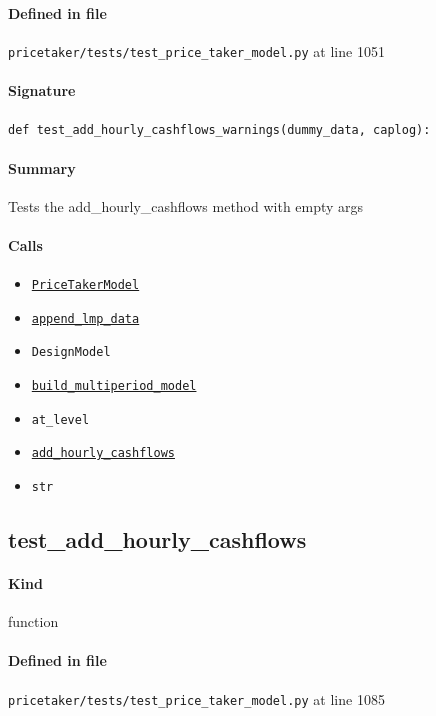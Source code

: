 \documentclass[11pt]{report}
\begin{document}
\paragraph{Defined in file} \texttt{pricetaker/tests/test\_price\_taker\_model.py} at line 1051
\paragraph{Signature} \texttt{def test\_add\_hourly\_cashflows\_warnings(dummy\_data, caplog):}
\paragraph{Summary} Tests the add\_hourly\_cashflows method with empty args
\paragraph{Calls}
\begin{itemize}[leftmargin=*]
  \item \hyperref[def:pricetaker-price_taker_model.py:PriceTakerModel:L161]{\texttt{PriceTakerModel}}
  \item \hyperref[def:pricetaker-price_taker_model.py:PriceTakerModel.append_lmp_data:L221]{\texttt{append\_lmp\_data}}
  \item \texttt{DesignModel}
  \item \hyperref[def:pricetaker-price_taker_model.py:PriceTakerModel.build_multiperiod_model:L291]{\texttt{build\_multiperiod\_model}}
  \item \texttt{at\_level}
  \item \hyperref[def:pricetaker-price_taker_model.py:PriceTakerModel.add_hourly_cashflows:L897]{\texttt{add\_hourly\_cashflows}}
  \item \texttt{str}
\end{itemize}
\subsection{test\_add\_hourly\_cashflows}
\label{def:pricetaker-tests-test_price_taker_model.py:test_add_hourly_cashflows:L1085}
\paragraph{Kind} function
\paragraph{Defined in file} \texttt{pricetaker/tests/test\_price\_taker\_model.py} at line 1085
\end{document}
